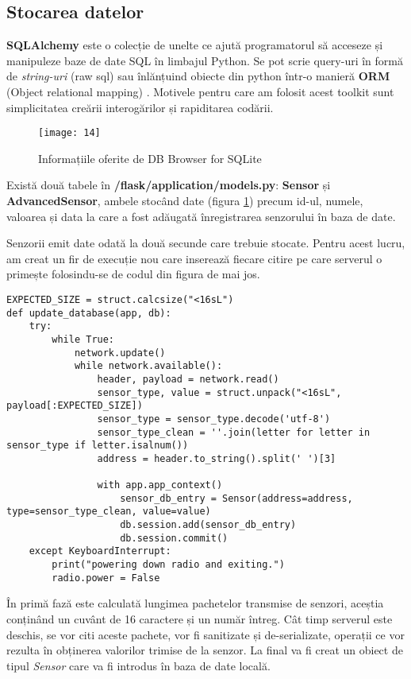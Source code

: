 \subsection{Stocarea datelor}

\textbf{SQLAlchemy} este o colecție de unelte ce ajută programatorul să acceseze și manipuleze baze de date SQL în limbajul Python. Se pot scrie query-uri în formă de \emph{string-uri} (raw sql) sau înlănțuind obiecte din python într-o manieră \textbf{ORM} (Object relational mapping) \cite{sql}. Motivele pentru care am folosit acest toolkit sunt simplicitatea creării interogărilor și rapiditarea codării.

\begin{figure}[h]
	\centering
	\texttt{[image: 14]}
	\caption{Informațiile oferite de DB Browser for SQLite}
	\label{fig:14}
\end{figure}

Există două tabele în \textbf{/flask/application/models.py}: \textbf{Sensor} și \textbf{AdvancedSensor}, ambele stocând date (figura \ref{fig:14}) precum id-ul, numele, valoarea și data la care a fost adăugată înregistrarea senzorului în baza de date.

\break

Senzorii emit date odată la două secunde care trebuie stocate. Pentru acest lucru, am creat un fir de execuție nou care inserează fiecare citire pe care serverul o primește folosindu-se de codul din figura de mai jos.

\begin{lstlisting}[style=python, label=code:db]
EXPECTED_SIZE = struct.calcsize("<16sL")
def update_database(app, db):
	try:
		while True:
			network.update()
			while network.available():
				header, payload = network.read()
				sensor_type, value = struct.unpack("<16sL", payload[:EXPECTED_SIZE])
				sensor_type = sensor_type.decode('utf-8')
				sensor_type_clean = ''.join(letter for letter in sensor_type if letter.isalnum())
				address = header.to_string().split(' ')[3]
				
				with app.app_context()
					sensor_db_entry = Sensor(address=address, type=sensor_type_clean, value=value)
					db.session.add(sensor_db_entry)
					db.session.commit()
	except KeyboardInterrupt:
		print("powering down radio and exiting.")
		radio.power = False
\end{lstlisting}

În primă fază este calculată lungimea pachetelor transmise de senzori, aceștia conținând un cuvânt de 16 caractere și un număr întreg. Cât timp serverul este deschis, se vor citi aceste pachete, vor fi sanitizate și de-serializate, operații ce vor rezulta în obținerea valorilor trimise de la senzor.
La final va fi creat un obiect de tipul \emph{Sensor} care va fi introdus în baza de date locală.


